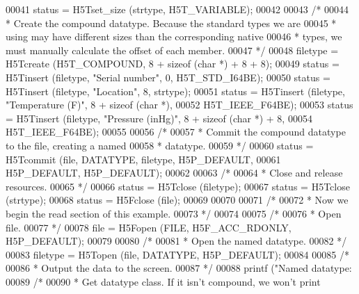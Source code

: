 \begin{DoxyCode}
00041     status = H5Tset\_size (strtype, H5T\_VARIABLE);
00042 
00043     \textcolor{comment}{/*}
00044 \textcolor{comment}{     * Create the compound datatype.  Because the standard types we are}
00045 \textcolor{comment}{     * using may have different sizes than the corresponding native}
00046 \textcolor{comment}{     * types, we must manually calculate the offset of each member.}
00047 \textcolor{comment}{     */}
00048     filetype = H5Tcreate (H5T\_COMPOUND, 8 + \textcolor{keyword}{sizeof} (\textcolor{keywordtype}{char} *) + 8 + 8);
00049     status = H5Tinsert (filetype, \textcolor{stringliteral}{"Serial number"}, 0, H5T\_STD\_I64BE);
00050     status = H5Tinsert (filetype, \textcolor{stringliteral}{"Location"}, 8, strtype);
00051     status = H5Tinsert (filetype, \textcolor{stringliteral}{"Temperature (F)"}, 8 + \textcolor{keyword}{sizeof} (\textcolor{keywordtype}{char} *),
00052                 H5T\_IEEE\_F64BE);
00053     status = H5Tinsert (filetype, \textcolor{stringliteral}{"Pressure (inHg)"}, 8 + \textcolor{keyword}{sizeof} (\textcolor{keywordtype}{char} *) + 8,
00054                 H5T\_IEEE\_F64BE);
00055 
00056     \textcolor{comment}{/*}
00057 \textcolor{comment}{     * Commit the compound datatype to the file, creating a named}
00058 \textcolor{comment}{     * datatype.}
00059 \textcolor{comment}{     */}
00060     status = H5Tcommit (file, DATATYPE, filetype, H5P\_DEFAULT,
00061                 H5P\_DEFAULT, H5P\_DEFAULT);
00062 
00063     \textcolor{comment}{/*}
00064 \textcolor{comment}{     * Close and release resources.}
00065 \textcolor{comment}{     */}
00066     status = H5Tclose (filetype);
00067     status = H5Tclose (strtype);
00068     status = H5Fclose (file);
00069 
00070 
00071     \textcolor{comment}{/*}
00072 \textcolor{comment}{     * Now we begin the read section of this example.}
00073 \textcolor{comment}{     */}
00074 
00075     \textcolor{comment}{/*}
00076 \textcolor{comment}{     * Open file.}
00077 \textcolor{comment}{     */}
00078     file = H5Fopen (FILE, H5F\_ACC\_RDONLY, H5P\_DEFAULT);
00079 
00080     \textcolor{comment}{/*}
00081 \textcolor{comment}{     * Open the named datatype.}
00082 \textcolor{comment}{     */}
00083     filetype = H5Topen (file, DATATYPE, H5P\_DEFAULT);
00084 
00085     \textcolor{comment}{/*}
00086 \textcolor{comment}{     * Output the data to the screen.}
00087 \textcolor{comment}{     */}
00088     printf (\textcolor{stringliteral}{"Named datatype: %
00089     \textcolor{comment}{/*}
00090 \textcolor{comment}{     * Get datatype class.  If it isn't compound, we won't print}
}
\end{DoxyCode}
